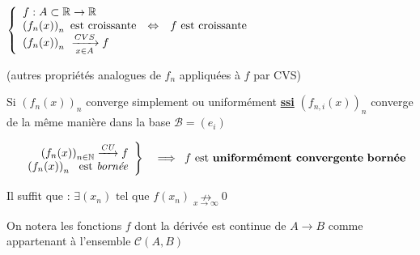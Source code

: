 \documentclass[11pt,a4paper,fleqn,pdftex]{report}
\begin{document}
\\
\begin{prop}
\begin{list}{-}{ }
\item $\left\lbrace
\begin{array}{l c l}
f:A\subset\mathbb{R}\to\mathbb{R}& & \\
\left(f_n(x)\right)_n\text{ est croissante}&\Leftrightarrow&f\text{ est croissante}\\
\left(f_n(x)\right)_n\ \xrightarrow[x\in{}A]{CVS}f& & \\
\end{array}\right.$
\item (autres propriétés analogues de $f_n$ appliquées à $f$ par CVS)
\end{list}
\end{prop}
%
\begin{theorem}
Si $\left(f_n(x)\right)_n$ converge simplement ou uniformément \uline{\textbf{ssi}} $\left(f_{n,i}(x)\right)_n$ converge de la même manière dans la base $\mathcal{B}=(e_i)$
\end{theorem}
\begin{theorem}
\[
\begin{array}{r c}

\left.
\begin{array}{r}
\left(f_n(x)\right)_{n\in\mathbb{N}}\xrightarrow{\emph{CU}}f\\
\left(f_n(x)\right)_n\ \text{ est \emph{bornée}}\\
\end{array}\right\rbrace & \implies
\end{array}
f \text{ est \textbf{uniformément convergente} \textbf{bornée}}
\]
\end{theorem}
\begin{theorem}
Il suffit que : 
$\exists (x_n)\text{ tel que }f(x_n)\underset{x\to{}\infty}{\nrightarrow}0$
\end{theorem}
On notera les fonctions $f$ dont la dérivée est continue de $A\to B$ comme appartenant à l'ensemble $\mathcal{C}(A,B)$
\end{document}
